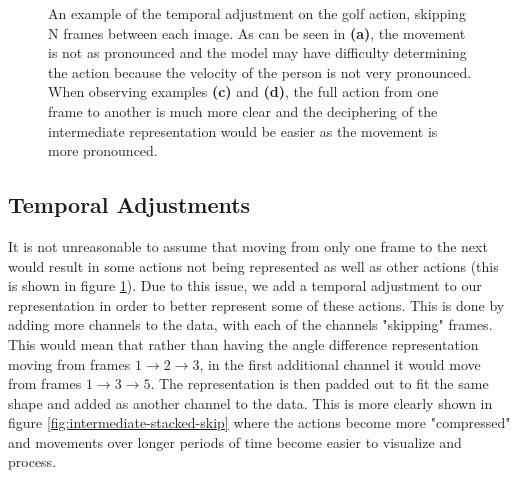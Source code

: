 \begin{figure}[ht]
	\caption{An example of the temporal adjustment on the golf action, skipping N frames between each image. As can be seen in \textbf{(a)}, the movement is not as pronounced and the model may have difficulty determining the action because the velocity of the person is not very pronounced. When observing examples \textbf{(c)} and \textbf{(d)}, the full action from one frame to another is much more clear and the deciphering of the intermediate representation would be easier as the movement is more pronounced.}
	\label{fig:temporal-adjustment-example}
\end{figure}

\subsection{Temporal Adjustments}

It is not unreasonable to assume that moving from only one frame to the next would result in some actions not being represented as well as other actions (this is shown in figure \ref{fig:temporal-adjustment-example}). Due to this issue, we add a temporal adjustment to our representation in order to better represent some of these actions. This is done by adding more channels to the data, with each of the channels "skipping" frames. This would mean that rather than having the angle difference representation moving from frames $1 \rightarrow 2 \rightarrow 3$, in the first additional channel it would move from frames $1 \rightarrow 3 \rightarrow 5$. The representation is then padded out to fit the same shape and added as another channel to the data. This is more clearly shown in figure \ref{fig:intermediate-stacked-skip} where the actions become more "compressed" and movements over longer periods of time become easier to visualize and process.

